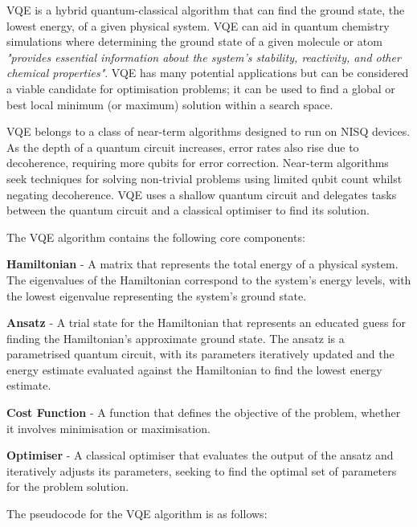 \documentclass{article}
\begin{document}
{VQE is a hybrid quantum-classical algorithm that can find the ground state, the lowest energy, of a given physical system\cite{Tilly2022}. VQE can aid in quantum chemistry simulations where determining the ground state of a given molecule or atom \textit{"provides essential information about the system's stability, reactivity, and other chemical properties"}\cite{queragroundstate}. VQE has many potential applications but can be considered a viable candidate for optimisation problems; it can be used to find a global or best local minimum (or maximum) solution within a search space\cite{vqeqiskit}\cite{VQEMax}. 

VQE belongs to a class of near-term algorithms designed to run on NISQ devices. As the depth of a quantum circuit increases, error rates also rise due to decoherence, requiring more qubits for error correction. Near-term algorithms seek techniques for solving non-trivial problems using limited qubit count whilst negating decoherence\cite{Huang_2023}. VQE uses a shallow quantum circuit and delegates tasks between the quantum circuit and a classical optimiser to find its solution\cite{vqeqiskit}\cite{Peruzzo2014}.

The VQE algorithm contains the following core components:

\textbf{Hamiltonian} - A matrix that represents the total energy of a physical system\cite{hamiltonian}. The eigenvalues of the Hamiltonian correspond to the system's energy levels, with the lowest eigenvalue representing the system's ground state\cite{vqeqiskit}.

\textbf{Ansatz} - A trial state for the Hamiltonian that represents an educated guess for finding the Hamiltonian's approximate ground state. The ansatz is a parametrised quantum circuit, with its parameters iteratively updated and the energy estimate evaluated against the Hamiltonian to find the lowest energy estimate\cite{Tilly2022}\cite{Tutorial}.

\textbf{Cost Function} - A function that defines the objective of the problem, whether it involves minimisation or maximisation\cite{vqeqiskit}.

\textbf{Optimiser} - A classical optimiser that evaluates the output of the ansatz and iteratively adjusts its parameters, seeking to find the optimal set of parameters for the problem solution\cite{Tutorial}\cite{vqeqiskit}. 

The pseudocode for the VQE algorithm is as follows:

}
\end{document}
